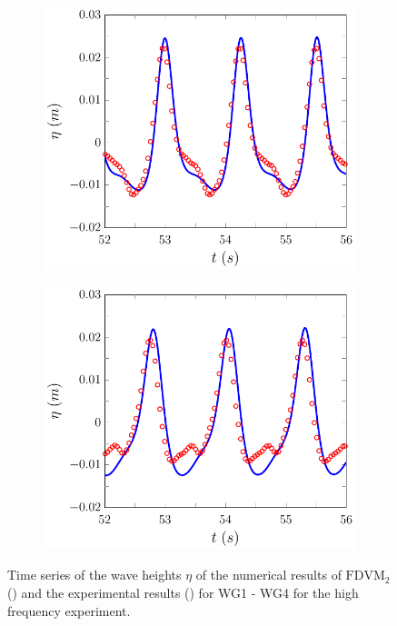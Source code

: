 \begin{figure}
\begin{subfigure}{0.5\textwidth}
		\vspace{0.5cm}
	\end{subfigure}
	\begin{subfigure}{0.5\textwidth}
		\includegraphics[width=\textwidth]{./chp6/figures/Experiment/Beji/sh/FDVMWG3.pdf}
		\vspace{0.5cm}
	\end{subfigure}%
	\begin{subfigure}{0.5\textwidth}
		\includegraphics[width=\textwidth]{./chp6/figures/Experiment/Beji/sh/FDVMWG4.pdf}
		\vspace{0.5cm}
	\end{subfigure}
	\caption{Time series of the wave heights $\eta$ of the numerical results of $\text{FDVM}_2$ ({\color{blue}\solidrule}) and the experimental results () for WG1 - WG4 for the high frequency experiment.}
	\label{fig:BejishWG1to4FDVM}
\end{figure}
